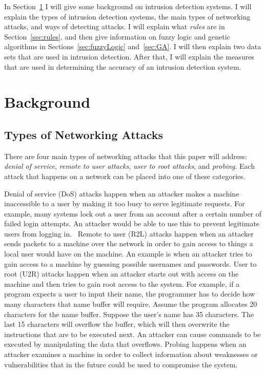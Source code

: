 \documentclass{sig-alternate}
\begin{document}
In Section~\ref{sec:background} I will give some background on intrusion detection systems. I will explain the types of intrusion detection systems, the main types of networking attacks, and ways of detecting attacks. I will explain what \emph{rules} are in Section~\ref{sec:rules}, and then give information on fuzzy logic and genetic algorithms in Sections~\ref{sec:fuzzyLogic} and~\ref{sec:GA}. I will then explain two data sets that are used in intrusion detection. After that, I will explain the measures that are used in determining the accuracy of an intrusion detection system.




\section{Background}
\label{sec:background}

\subsection{Types of Networking Attacks}
\label{sec:typesAttacks}
There are four main types of networking attacks that this paper will address: \emph{denial of service}, \emph{remote to user attacks}, \emph{user to root attacks}, and \emph{probing}. Each attack that happens on a network can be placed into one of these categories.~\cite{DBLP:journals/corr/abs-1204-1336}

Denial of service (DoS) attacks happen when an attacker makes a machine inaccessible to a user by making it too busy to serve legitimate requests. For example, many systems lock out a user from an account after a certain number of failed login attempts. An attacker would be able to use this to prevent legitimate users from logging in.~\cite{DoSAttacks} Remote to user (R2L) attacks happen when an attacker sends packets to a machine over the network in order to gain access to things a local user would have on the machine. An example is when an attacker tries to gain access to a machine by guessing possible usernames and passwords. User to root (U2R) attacks happen when an attacker starts out with access on the machine and then tries to gain root access to the system. For example, if a program expects a user to input their name, the programmer has to decide how many characters that name buffer will require. Assume the program allocates 20 characters for the name buffer. Suppose the user's name has 35 characters. The last 15 characters will overflow the buffer, which will then overwrite the instructions that are to be executed next. An attacker can cause commands to be executed by manipulating the data that overflows. Probing happens when an attacker examines a machine in order to collect information about weaknesses or vulnerabilities that in the future could be used to compromise the system.~\cite{DBLP:journals/corr/abs-1204-1336, typesOfAttacks}
\end{document}
